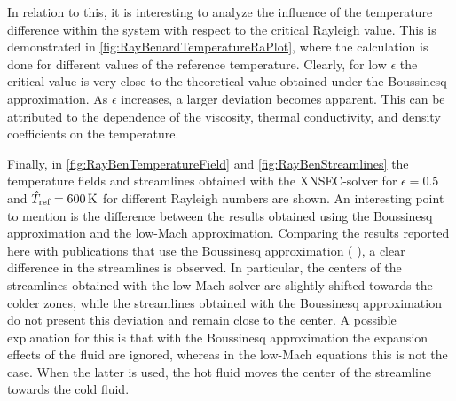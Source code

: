 In relation to this, it is interesting to analyze the influence of the temperature difference within the system with respect to the critical Rayleigh value. This is demonstrated in \cref{fig:RayBenardTemperatureRaPlot}, where the calculation is done for different values of the reference temperature. Clearly, for low $\epsilon$  the critical value is very close to the theoretical value obtained under the Boussinesq approximation. As $\epsilon$ increases, a larger deviation becomes apparent. This can be attributed to the dependence of the viscosity, thermal conductivity, and density coefficients on the temperature. 

Finally, in \cref{fig:RayBenTemperatureField} and \cref{fig:RayBenStreamlines} the temperature fields and streamlines obtained with the XNSEC-solver for $\epsilon = 0.5$ and $\hat T_{\text{ref}} = \SI{600}{\kelvin}$ for different Rayleigh numbers are shown. An interesting point to mention is the difference between the results obtained using the Boussinesq approximation and the low-Mach approximation. Comparing the results reported here with publications that use the Boussinesq approximation ( \cite{shishkinaRayleighBenardConvectionContainer2021,zhouNumericalSimulationLaminar2004}), a clear difference in the streamlines is observed. In particular, the centers of the streamlines obtained with the low-Mach solver are slightly shifted towards the colder zones, while the streamlines obtained with the Boussinesq approximation do not present this deviation and remain close to the center. A possible explanation for this is that with the Boussinesq approximation the expansion effects of the fluid are ignored, whereas in the low-Mach equations this is not the case. When the latter is used, the hot fluid moves the center of the streamline towards the cold fluid.
